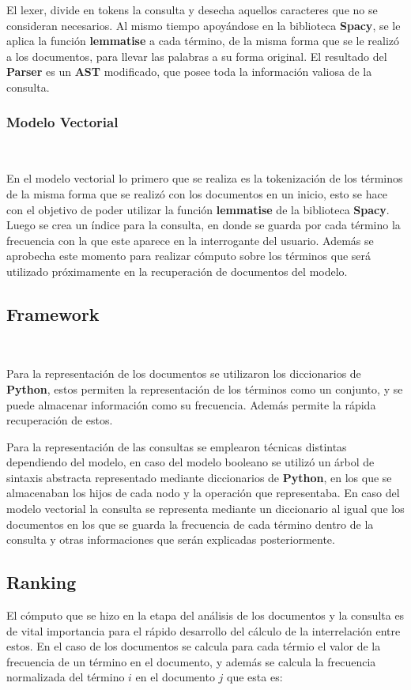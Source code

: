 \documentclass{llncs}
\begin{document}
El lexer, divide en tokens la consulta y desecha aquellos caracteres que no se consideran necesarios. Al mismo tiempo apoyándose en la biblioteca {\bfseries Spacy}, se le aplica la función {\bfseries lemmatise} a cada término, de la misma forma que se le realizó a los documentos, para llevar las palabras a su forma original. El resultado del {\bfseries Parser} es un {\bfseries AST} modificado, que posee toda la información valiosa de la consulta.

\subsubsection{Modelo Vectorial}\

En el modelo vectorial lo primero que se realiza es la tokenización de los términos de la misma forma que se realizó con los documentos en un inicio,
esto se hace con el objetivo de poder utilizar la función {\bfseries lemmatise} de la biblioteca {\bfseries Spacy}. Luego se crea un índice para la consulta, en donde se guarda por cada término la frecuencia con la que este aparece en la interrogante del usuario. Además se aprobecha este momento para realizar cómputo sobre los términos que será utilizado próximamente en la recuperación de documentos del modelo.

\subsection{Framework}\

Para la representación de los documentos se utilizaron los diccionarios de {\bfseries Python}, estos permiten la representación de los términos como un conjunto, y se puede almacenar información como su frecuencia. Además permite la rápida recuperación de estos.

Para la representación de las consultas se emplearon técnicas distintas dependiendo del modelo, en caso del modelo booleano se utilizó un árbol de sintaxis abstracta representado mediante diccionarios de {\bfseries Python}, en los que se almacenaban los hijos de cada nodo y la operación que representaba. En caso del modelo vectorial la consulta se representa mediante un diccionario al igual que los documentos en los que se guarda la frecuencia de cada término dentro de la consulta y otras informaciones que serán explicadas posteriormente.

\subsection{Ranking}
El cómputo que se hizo en la etapa del análisis de los documentos y la consulta es de vital importancia para el rápido desarrollo del cálculo de la interrelación entre estos. En el caso de los documentos se calcula para cada térmio el valor de la frecuencia de un término en el documento, y además se calcula la frecuencia normalizada del término $i$ en el documento $j$ que esta es:
\end{document}
